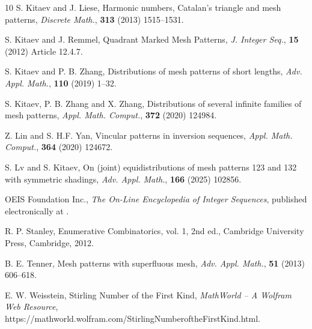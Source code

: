 \documentclass[12pt]{article}
\begin{document}
\begin{thebibliography}{10}
 S. Kitaev and J. Liese, Harmonic numbers, Catalan's triangle and mesh patterns, {\em Discrete Math.}, {\bf 313} (2013) 1515--1531.

 S. Kitaev and J. Remmel, Quadrant Marked Mesh Patterns, {\em J. Integer Seq.}, {\bf 15} (2012) Article 12.4.7. 

 S. Kitaev and P. B. Zhang, Distributions of mesh patterns of short lengths, {\em Adv. Appl. Math.}, {\bf 110} (2019) 1--32.

  S. Kitaev, P. B. Zhang and X. Zhang, Distributions of several infinite families of mesh patterns, {\em Appl. Math. Comput.}, {\bf 372} (2020) 124984.

  Z. Lin and S. H.F. Yan, Vincular patterns in inversion sequences, {\em Appl. Math. Comput.}, {\bf 364} (2020) 124672.

 S. Lv  and S. Kitaev, On (joint) equidistributions of mesh patterns 123 and 132 with symmetric shadings, {\em Adv. Appl. Math.}, {\bf 166} (2025) 102856.

 OEIS Foundation Inc., {\it The {O}n-{L}ine {E}ncyclopedia of {I}nteger {S}equences},
published electronically at \phantom{*}{\tt
https://oeis.org}.

 R. P. Stanley, Enumerative Combinatorics, vol. 1, 2nd ed., Cambridge University Press, Cambridge, 2012.

  B. E. Tenner, Mesh patterns with superfluous mesh, {\em Adv. Appl. Math.}, {\bf 51} (2013) 606--618.

E.  W. Weisstein,  Stirling Number of the First Kind, {\em MathWorld -- A Wolfram Web Resource}, https://mathworld.wolfram.com/StirlingNumberoftheFirstKind.html. 

\end{thebibliography}
\end{document}

